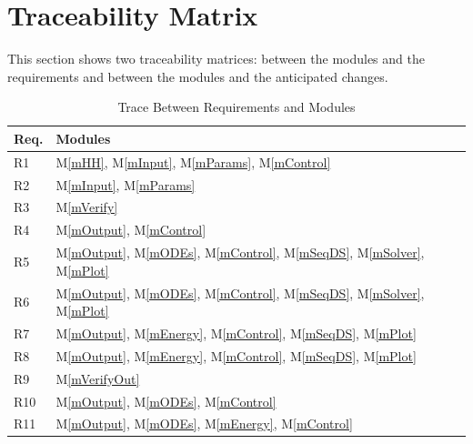 \documentclass[12pt, titlepage]{article}
\newcommand{\mref}[1]{M\ref{#1}}
\begin{document}
\section{Traceability Matrix} \label{SecTM}

This section shows two traceability matrices: between the modules and the
requirements and between the modules and the anticipated changes.

\begin{table}[H]
\centering
\begin{tabular}{p{} p{}}
\toprule
\textbf{Req.} & \textbf{Modules}\\
\midrule
R1 & \mref{mHH}, \mref{mInput}, \mref{mParams}, \mref{mControl}\\
R2 & \mref{mInput}, \mref{mParams}\\
R3 & \mref{mVerify}\\
R4 & \mref{mOutput}, \mref{mControl}\\
R5 & \mref{mOutput}, \mref{mODEs}, \mref{mControl}, \mref{mSeqDS}, \mref{mSolver}, \mref{mPlot}\\
R6 & \mref{mOutput}, \mref{mODEs}, \mref{mControl}, \mref{mSeqDS}, \mref{mSolver}, \mref{mPlot}\\
R7 & \mref{mOutput}, \mref{mEnergy}, \mref{mControl}, \mref{mSeqDS}, \mref{mPlot}\\
R8 & \mref{mOutput}, \mref{mEnergy}, \mref{mControl}, \mref{mSeqDS}, \mref{mPlot}\\
R9 & \mref{mVerifyOut}\\
R10 & \mref{mOutput}, \mref{mODEs}, \mref{mControl}\\
R11 & \mref{mOutput}, \mref{mODEs}, \mref{mEnergy}, \mref{mControl}\\
\bottomrule
\end{tabular}
\caption{Trace Between Requirements and Modules}
\label{TblRT}
\end{table}
\end{document}
